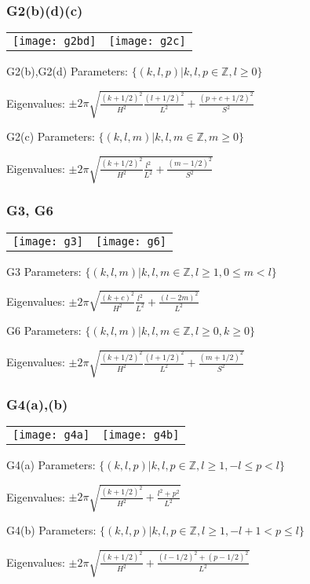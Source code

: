 \documentclass{beamer}
\def\Z{{\mathbb Z}}
\begin{document}
\begin{frame}
	\frametitle{G2(b)(d)(c)}
		\begin{tabular}[]{lr}
\texttt{[image: g2bd]} & \texttt{[image: g2c]}\\
		\end{tabular}
		\begin{block}{G2(b),G2(d)}
			Parameters: $\{(k,l,p)| k,l,p \in \Z, l \geq 0\}$

			Eigenvalues: $\pm 2\pi\sqrt{\frac{(k+1/2)^2}{H^2}\frac{(l+1/2)^2}{L^2} + \frac{(p+c+1/2)^2}{S^2}}$
		\end{block}
		\begin{block}{G2(c)}
			Parameters: $\{(k,l,m)| k,l,m \in \Z, m \geq 0\}$

			Eigenvalues: $\pm 2\pi\sqrt{\frac{(k+1/2)^2}{H^2}\frac{l^2}{L^2} + \frac{(m-1/2)^2}{S^2}}$
		\end{block}
\end{frame}

\begin{frame}
	\frametitle{G3, G6}
		\begin{tabular}[]{lr}
\texttt{[image: g3]} & \texttt{[image: g6]}\\
		\end{tabular}
		\begin{block}{G3}
			Parameters: $\{(k,l,m)| k,l,m \in \Z, l \geq 1, 0 \leq m < l\}$

			Eigenvalues: $\pm 2\pi\sqrt{\frac{(k+c)^2}{H^2}\frac{l^2}{L^2} + \frac{(l - 2m)^2}{L^2}}$
		\end{block}
		\begin{block}{G6}
			Parameters: $\{(k,l,m)| k,l,m \in \Z, l \geq 0, k\geq 0\}$

			Eigenvalues: $\pm 2\pi\sqrt{\frac{(k+1/2)^2}{H^2}\frac{(l+1/2)^2}{L^2} + \frac{(m + 1/2)^2}{S^2}}$
		\end{block}
\end{frame}

\begin{frame}
	\frametitle{G4(a),(b)}
		\begin{tabular}[]{lr}
\texttt{[image: g4a]} & \texttt{[image: g4b]}\\
		\end{tabular}
		\begin{block}{G4(a)}
			Parameters: $\{(k,l,p)| k,l,p \in \Z, l \geq 1, -l \leq p < l\}$

			Eigenvalues: $\pm 2\pi\sqrt{\frac{(k+1/2)^2}{H^2} + \frac{l^2 + p^2}{L^2}}$
		\end{block}
		\begin{block}{G4(b)}
			Parameters: $\{(k,l,p)| k,l,p \in \Z, l \geq 1, -l + 1 < p \leq l\}$

			Eigenvalues: $\pm 2\pi\sqrt{\frac{(k+1/2)^2}{H^2} + \frac{(l-1/2)^2 + (p - 1/2)^2}{L^2}}$
		\end{block}
\end{frame}
\end{document}
